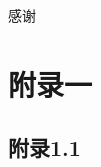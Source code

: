 \documentclass[pageheader,chapter,shorttitle,mathtxf]{NJUbachelor}
\begin{document}








%



\newpage
{}

\nocite{*}

%


\ack

感谢

\appendix

\chapter{附录一}

\section{附录1.1}
\end{document}
